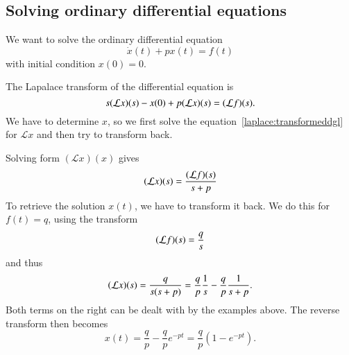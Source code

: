 \subsection{Solving ordinary differential equations}
We want to solve the ordinary differential equation
\[
\dot x(t)+px(t)=f(t)
\]
with initial condition $x(0)=0$.

The Lapalace transform of the differential equation is
\begin{equation}
s({\cal L}x)(s)-x(0)+p({\cal L}x)(s)=({\cal L}f)(s).
\label{laplace:transformeddgl}
\end{equation}
We have to determine $x$, so we first solve the
equation~\eqref{laplace:transformeddgl} for $\mathcal{L}x$ and
then try to transform back.

Solving form $(\mathcal{L}x)(x)$ gives
\[
({\cal L}x)(s)
=
\frac{({\cal L}f)(s)}{s+p}
\]
To retrieve the solution $x(t)$, we have to transform it back.
We do this for $f(t)=q$, using the transform
\[
({\cal L}f)(s)=\frac{q}{s}
\]
and thus 
\[
({\cal L}x)(s)
=
\frac{q}{s(s+p)}=\frac{q}{p}\frac{1}{s}-\frac{q}{p}\frac{1}{s+p}.
\]
Both terms on the right can be dealt with by the examples
above.
The reverse transform then becomes
\[
x(t)=\frac{q}{p}-\frac{q}{p}e^{-pt}=\frac{q}{p}(1-e^{-pt}).
\]

